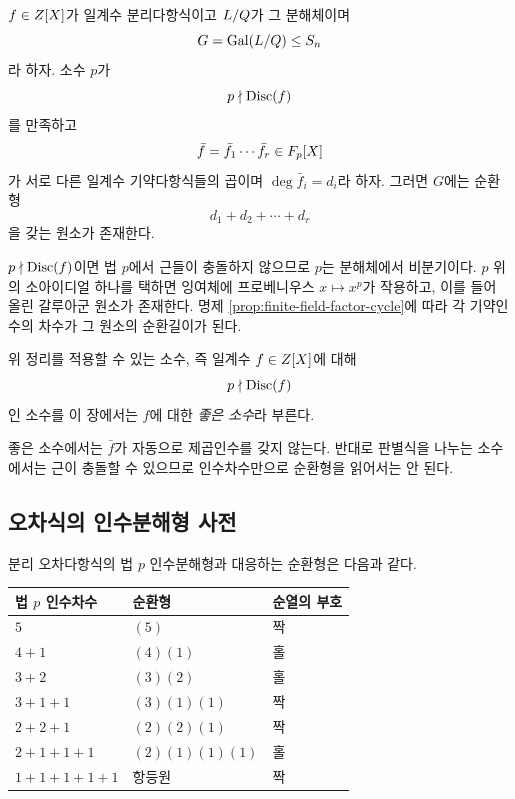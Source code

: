 \begin{theorem}
\label{thm:dedekind-frobenius-cycle}
$f\in Z[X]$가 일계수 분리다항식이고 $L/Q$가 그 분해체이며
\[
  G=\operatorname{Gal}(L/Q)\le S_n
\]
라 하자. 소수 $p$가
\[
  p\nmid\operatorname{Disc}(f)
\]
를 만족하고
\[
  \bar f=\bar f_1\cdots\bar f_r\in F_p[X]
\]
가 서로 다른 일계수 기약다항식들의 곱이며 $\deg\bar f_i=d_i$라 하자. 그러면 $G$에는 순환형
\[
  d_1+d_2+\cdots+d_r
\]
을 갖는 원소가 존재한다.
\end{theorem}

\begin{proofidea}
$p\nmid\operatorname{Disc}(f)$이면 법 $p$에서 근들이 충돌하지 않으므로 $p$는 분해체에서 비분기이다. $p$ 위의 소아이디얼 하나를 택하면 잉여체에 프로베니우스 $x\mapsto x^p$가 작용하고, 이를 들어 올린 갈루아군 원소가 존재한다. 명제 \ref{prop:finite-field-factor-cycle}에 따라 각 기약인수의 차수가 그 원소의 순환길이가 된다.
\end{proofidea}

\begin{definition}[좋은 소수]
위 정리를 적용할 수 있는 소수, 즉 일계수 $f\in Z[X]$에 대해
\[
  p\nmid\operatorname{Disc}(f)
\]
인 소수를 이 장에서는 $f$에 대한 \emph{좋은 소수}라 부른다.
\end{definition}

좋은 소수에서는 $\bar f$가 자동으로 제곱인수를 갖지 않는다. 반대로 판별식을 나누는 소수에서는 근이 충돌할 수 있으므로 인수차수만으로 순환형을 읽어서는 안 된다.

\subsection{오차식의 인수분해형 사전}

분리 오차다항식의 법 $p$ 인수분해형과 대응하는 순환형은 다음과 같다.

\begin{center}
\renewcommand{\arraystretch}{1.2}
\begin{tabular}{lll}
\toprule
법 $p$ 인수차수 & 순환형 & 순열의 부호 \\
\midrule
$5$ & $(5)$ & 짝 \\
$4+1$ & $(4)(1)$ & 홀 \\
$3+2$ & $(3)(2)$ & 홀 \\
$3+1+1$ & $(3)(1)(1)$ & 짝 \\
$2+2+1$ & $(2)(2)(1)$ & 짝 \\
$2+1+1+1$ & $(2)(1)(1)(1)$ & 홀 \\
$1+1+1+1+1$ & 항등원 & 짝 \\
\bottomrule
\end{tabular}
\end{center}

